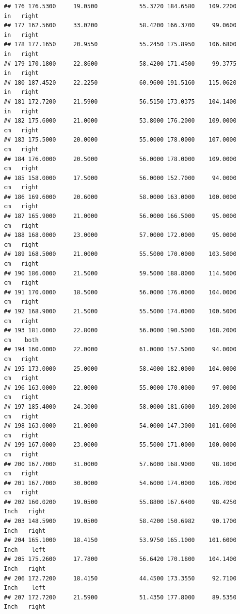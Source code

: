 \documentclass[]{article}
\begin{document}
\begin{verbatim}
## 176 176.5300     19.0500            55.3720 184.6580    109.2200     in   right
## 177 162.5600     33.0200            58.4200 166.3700     99.0600     in   right
## 178 177.1650     20.9550            55.2450 175.8950    106.6800     in   right
## 179 170.1800     22.8600            58.4200 171.4500     99.3775     in   right
## 180 187.4520     22.2250            60.9600 191.5160    115.0620     in   right
## 181 172.7200     21.5900            56.5150 173.0375    104.1400     in   right
## 182 175.6000     21.0000            53.8000 176.2000    109.0000     cm   right
## 183 175.5000     20.0000            55.0000 178.0000    107.0000     cm   right
## 184 176.0000     20.5000            56.0000 178.0000    109.0000     cm   right
## 185 158.0000     17.5000            56.0000 152.7000     94.0000     cm   right
## 186 169.6000     20.6000            58.0000 163.0000    100.0000     cm   right
## 187 165.9000     21.0000            56.0000 166.5000     95.0000     cm   right
## 188 168.0000     23.0000            57.0000 172.0000     95.0000     cm   right
## 189 168.5000     21.0000            55.5000 170.0000    103.5000     cm   right
## 190 186.0000     21.5000            59.5000 188.8000    114.5000     cm   right
## 191 170.0000     18.5000            56.0000 176.0000    104.0000     cm   right
## 192 168.9000     21.5000            55.5000 174.0000    100.5000     cm   right
## 193 181.0000     22.8000            56.0000 190.5000    108.2000     cm    both
## 194 160.0000     22.0000            61.0000 157.5000     94.0000     cm   right
## 195 173.0000     25.0000            58.4000 182.0000    104.0000     cm   right
## 196 163.0000     22.0000            55.0000 170.0000     97.0000     cm   right
## 197 185.4000     24.3000            58.0000 181.6000    109.2000     cm   right
## 198 163.0000     21.0000            54.0000 147.3000    101.6000     cm   right
## 199 167.0000     23.0000            55.5000 171.0000    100.0000     cm   right
## 200 167.7000     31.0000            57.6000 168.9000     98.1000     cm   right
## 201 167.7000     30.0000            54.6000 174.0000    106.7000     cm   right
## 202 160.0200     19.0500            55.8800 167.6400     98.4250   Inch   right
## 203 148.5900     19.0500            58.4200 150.6982     90.1700   Inch   right
## 204 165.1000     18.4150            53.9750 165.1000    101.6000   Inch    left
## 205 175.2600     17.7800            56.6420 170.1800    104.1400   Inch   right
## 206 172.7200     18.4150            44.4500 173.3550     92.7100   Inch    left
## 207 172.7200     21.5900            51.4350 177.8000     89.5350   Inch   right

\end{verbatim}
\end{document}
